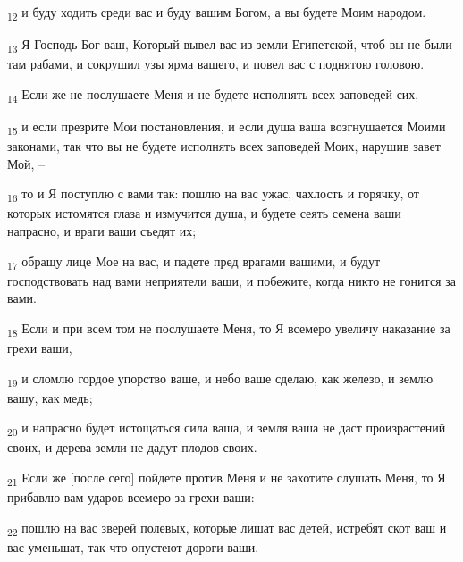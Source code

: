 \begin{tcolorbox}
\textsubscript{12} и буду ходить среди вас и буду вашим Богом, а вы будете Моим народом.
\end{tcolorbox}
\begin{tcolorbox}
\textsubscript{13} Я Господь Бог ваш, Который вывел вас из земли Египетской, чтоб вы не были там рабами, и сокрушил узы ярма вашего, и повел вас с поднятою головою.
\end{tcolorbox}
\begin{tcolorbox}
\textsubscript{14} Если же не послушаете Меня и не будете исполнять всех заповедей сих,
\end{tcolorbox}
\begin{tcolorbox}
\textsubscript{15} и если презрите Мои постановления, и если душа ваша возгнушается Моими законами, так что вы не будете исполнять всех заповедей Моих, нарушив завет Мой, --
\end{tcolorbox}
\begin{tcolorbox}
\textsubscript{16} то и Я поступлю с вами так: пошлю на вас ужас, чахлость и горячку, от которых истомятся глаза и измучится душа, и будете сеять семена ваши напрасно, и враги ваши съедят их;
\end{tcolorbox}
\begin{tcolorbox}
\textsubscript{17} обращу лице Мое на вас, и падете пред врагами вашими, и будут господствовать над вами неприятели ваши, и побежите, когда никто не гонится за вами.
\end{tcolorbox}
\begin{tcolorbox}
\textsubscript{18} Если и при всем том не послушаете Меня, то Я всемеро увеличу наказание за грехи ваши,
\end{tcolorbox}
\begin{tcolorbox}
\textsubscript{19} и сломлю гордое упорство ваше, и небо ваше сделаю, как железо, и землю вашу, как медь;
\end{tcolorbox}
\begin{tcolorbox}
\textsubscript{20} и напрасно будет истощаться сила ваша, и земля ваша не даст произрастений своих, и дерева земли не дадут плодов своих.
\end{tcolorbox}
\begin{tcolorbox}
\textsubscript{21} Если же [после сего] пойдете против Меня и не захотите слушать Меня, то Я прибавлю вам ударов всемеро за грехи ваши:
\end{tcolorbox}
\begin{tcolorbox}
\textsubscript{22} пошлю на вас зверей полевых, которые лишат вас детей, истребят скот ваш и вас уменьшат, так что опустеют дороги ваши.
\end{tcolorbox}
